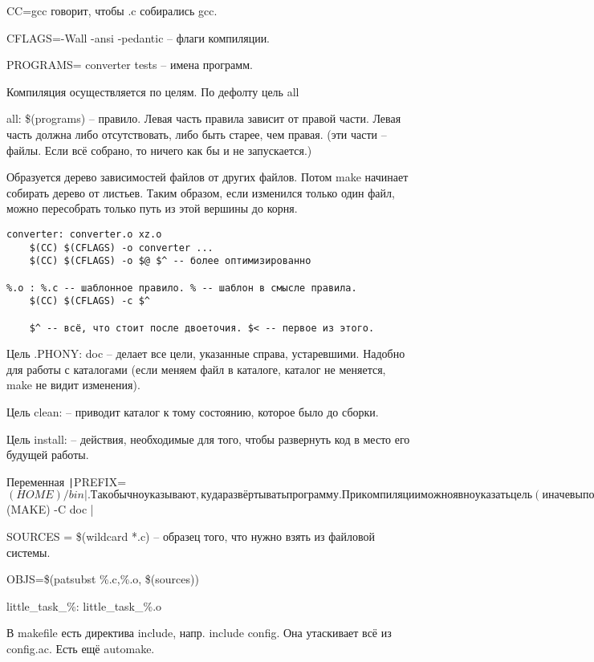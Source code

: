 \documentclass[a4paper,10pt]{article}
\newcommand{\bash}{\texttt}
\begin{document}
CC=gcc говорит, чтобы .c собирались gcc.

CFLAGS=-Wall -ansi -pedantic -- флаги компиляции.

PROGRAMS= converter tests -- имена программ.

Компиляция осуществляется по целям. По дефолту цель all

all: \$(programs) -- правило. Левая часть правила зависит от правой части. Левая часть должна либо отсутствовать, либо быть старее, чем правая. 
(эти части -- файлы. Если всё собрано, то ничего как бы и не запускается.)

Образуется дерево зависимостей файлов от других файлов. Потом make начинает собирать дерево от листьев. Таким образом, если изменился только один файл, можно пересобрать только путь из этой вершины до корня.

\begin{verbatim}
converter: converter.o xz.o
	$(CC) $(CFLAGS) -o converter ... 
	$(CC) $(CFLAGS) -o $@ $^ -- более оптимизированно

%.o : %.c -- шаблонное правило. % -- шаблон в смысле правила.
	$(CC) $(CFLAGS) -c $^

	$^ -- всё, что стоит после двоеточия. $< -- первое из этого.
\end{verbatim}
Цель .PHONY: doc -- делает все цели, указанные справа, устаревшими. Надобно для работы с каталогами (если меняем файл в каталоге, каталог не меняется, make не видит изменения).

Цель clean: -- приводит каталог к тому состоянию, которое было до сборки.

Цель install: -- действия, необходимые для того, чтобы развернуть код в место его будущей работы.

Переменная \bash|PREFIX=$(HOME)/bin|. Так обычно указывают, куда развёртывать программу.

При компиляции можно явно указать цель (иначе выполняется первая цель в Makefile). Напр., make clean.

Если хочется вызвать make из подкаталога, то \bash|$(MAKE) -C doc |

SOURCES = \$(wildcard *.c) -- образец того, что нужно взять из файловой системы.

OBJS=\$(patsubst \%.c,\%.o, \$(sources))

little\_task\_\%: little\_task\_\%.o

В makefile есть директива include, напр. include config. Она утаскивает всё из config.ac. Есть ещё automake.
\end{document}
